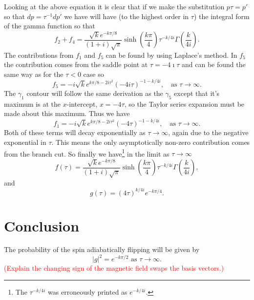 Looking at the above equation it is clear that if we make the substitution $p\tau = p'$ so that $dp = \tau^{-1}dp'$ we have will have (to the highest order in $\tau$) the integral form of the gamma function so that
\begin{equation}
	f_{2}+f_{4} = \frac{\sqrt{k} e^{-k\pi/8}}{\left(1+i\right)\sqrt{\pi}}\sinh\left(\frac{k\pi}{4}\right)\tau^{-k/4i}\Gamma\left(\frac{k}{4i}\right).
\end{equation}
The contributions from $f_1$ and $f_5$ can be found by using Laplace's method.
In $f_5$ the contribution comes from the saddle point at $\tau= -4\imath\tau$ and can be found the same way as for the $\tau < 0$ case so 
\begin{equation}
	f_{5} = -i\sqrt{k}e^{k\pi/8-2i\tau^{2}}\left(-4i \tau\right)^{-1-k/4i}, \quad \text{as } \tau \to \infty.
\end{equation}
The $\gamma_{1}$ contour will follow the same derivation as the $\gamma_{5}$ except that it's maximum is at the $x$-intercept, $x=-4\tau$, so the Taylor series expansion must be made about this maximum. 
Thus we have
\begin{equation}
	f_{1} = -i\sqrt{k}e^{k\pi/8-2i\tau^{2}}\left(-4 \tau\right)^{-1-k/4i}, \quad \text{as } \tau \to \infty.
\end{equation}
Both of these terms will decay exponentially as $\tau \to \infty$, again due to the negative exponential in $\tau$.
This means the only asymptotically non-zero contribution comes from the branch cut.
So finally we have\footnote{The $\tau^{-k/4i}$ was erroneously printed as $e^{-k/4i}$.} in the limit as $\tau \to \infty$
\begin{equation}
	f(\tau) =  \frac{\sqrt{k} e^{-k\pi/8}}{\left(1+i\right)\sqrt{\pi}}\sinh\left(\frac{k\pi}{4}\right)\tau^{-k/4i}\Gamma\left(\frac{k}{4i}\right),
\end{equation}
and 
\begin{equation}
	g(\tau) = (4\tau)^{k/4i}e^{-k\pi/4}.
\end{equation}


\section{Conclusion} \label{sec:majorana_conc}

The probability of the spin adiabatically flipping will be given by 
\begin{equation}
    \left\vert g \right\vert^{2} = e^{-k\pi/2} \textrm{ as } \tau \to \infty. \label{eq:majProb}
\end{equation}
\textcolor{red}{(Explain the changing sign of the magnetic field swaps the basis vectors.)}


